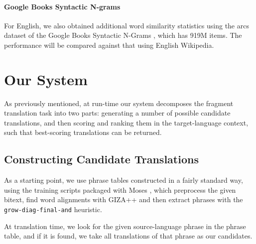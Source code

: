 \documentclass[11pt]{article}
\begin{document}
\paragraph{Google Books Syntactic N-grams}

For English, we also obtained additional word similarity statistics using the arcs dataset of the Google Books Syntactic N-Grams \cite{goldberg:orwant:13}, which has 919M items. The performance will be compared against that using English Wikipedia. 
 

\section{Our  System}
\label{sec:system}

As previously mentioned, at run-time our system decomposes the fragment
translation task into two parts: generating a number of possible candidate
translations, and then scoring and ranking them in the target-language context,
such that best-scoring translations can be returned.

\subsection{Constructing Candidate Translations}
\label{sec:candidates}

As a starting point, we use phrase tables constructed in a fairly standard way,
using the training scripts packaged with Moses \cite{koehn:hoang:ea:07}, which
preprocess the given bitext, find word alignments with GIZA++ \cite{och:ney:00}
and then extract phrases with the \texttt{grow-diag-final-and} heuristic. 

At translation time, we look for the given source-language phrase in the phrase
table, and if it is found, we take all translations of that phrase as our
candidates.
\end{document}

